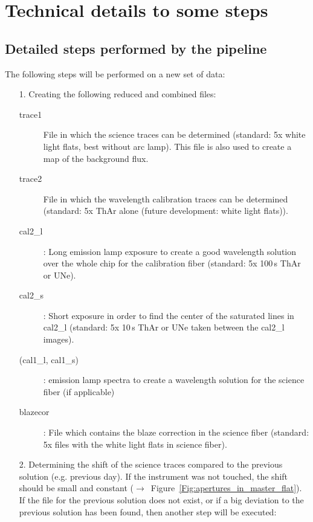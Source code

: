 \documentclass[10pt,a4paper]{article}
\begin{document}


\newpage
\section{Technical details to some steps}


\subsection{Detailed steps performed by the pipeline}
\label{Section:pipeline_steps_general}

\noindent The following steps will be performed on a new set of data:
\begin{itemize}
  \item[1.] Creating the following reduced and combined files:
  \begin{description}
    \item[trace1] File in which the science traces can be determined (standard: 5x white light flats, best without arc lamp). This file is also used to create a map of the background flux.
    \item[trace2] File in which the wavelength calibration traces can be determined (standard: 5x ThAr alone (future development: white light flats)).
    \item[cal2\_l]: Long emission lamp exposure to create a good wavelength solution over the whole chip for the calibration fiber (standard: 5x 100\,s ThAr or UNe).
    \item[cal2\_s]: Short exposure in order to find the center of the saturated lines in cal2\_l (standard: 5x 10\,s ThAr or UNe taken between the cal2\_l images).
    \item[(cal1\_l, cal1\_s)]: emission lamp spectra to create a wavelength solution for the science fiber (if applicable)
    \item[blazecor]: File which contains the blaze correction in the science fiber (standard: 5x files with the white light flats in science fiber).
  \end{description}
  \item[2.] Determining the shift of the science traces compared to the previous solution (e.g. previous day). If the instrument was not touched, the shift should be small and constant ($\rightarrow$~Figure~\ref{Fig:apertures_in_master_flat}). If the file for the previous solution does not exist, or if a big deviation to the previous solution has been found, then another step will be executed:

\end{itemize}
\end{document}
